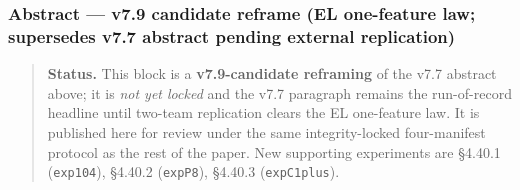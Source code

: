 \documentclass[
]{article}
\begin{document}
\subsubsection{Abstract --- v7.9 candidate reframe (EL one-feature law;
supersedes v7.7 abstract pending external
replication)}\label{abstract-v7.9-candidate-reframe-el-one-feature-law-supersedes-v7.7-abstract-pending-external-replication}

\begin{quote}
\textbf{Status.} This block is a \textbf{v7.9-candidate reframing} of
the v7.7 abstract above; it is \emph{not yet locked} and the v7.7
paragraph remains the run-of-record headline until two-team replication
clears the EL one-feature law. It is published here for review under the
same integrity-locked four-manifest protocol as the rest of the paper.
New supporting experiments are §4.40.1 (\texttt{exp104}), §4.40.2
(\texttt{expP8}), §4.40.3 (\texttt{expC1plus}).
\end{quote}
\end{document}
